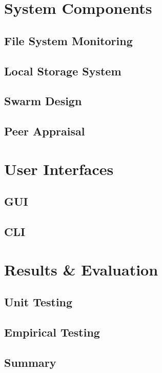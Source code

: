 \documentclass[a4paper, 11pt, twocolumn, twoside]{report}
\begin{document}
\chapter{System Components}

\section{File System Monitoring}

\section{Local Storage System}

\section{Swarm Design}

\section{Peer Appraisal}

\chapter{User Interfaces}

\section{GUI}

\section{CLI}

\chapter{Results \& Evaluation}

\section{Unit Testing}

\section{Empirical Testing}

\section{Summary}
\end{document}
